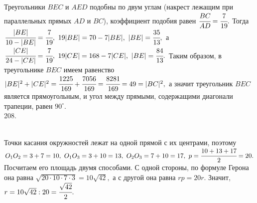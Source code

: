 \documentclass[12pt]{article}
\begin{document}
Треугольники $BEC$ и $AED$ подобны по двум углам (накрест лежащим при параллельных прямых $AD$ и $BC$), коэффициент подобия равен $\cfrac{BC}{AD}=
\cfrac{7}{19}.$ Тогда $\cfrac{|BE|}{10-|BE|}=\cfrac{7}{19},\ 19|BE|=70-7|BE|,\ |BE|=\cfrac{35}{13},$ а $\cfrac{|CE|}{24-|CE|}=\cfrac{7}{19},\ 19|CE|=168-7|CE|,\ |BE|=\cfrac{84}{13}.$ Таким образом, в треугольнике $BEC$ имеем равенство $|BE|^2+|CE|^2=\cfrac{1225}{169}+\cfrac{7056}{169}=\cfrac{8281}{169}=49=|BC|^2,$ а значит треугольник $BEC$ является прямоугольным, и угол между прямыми, содержащими диагонали трапеции, равен $90^\circ.$\\
208. \begin{figure}[ht!]
\end{figure}\\
Точки касания окружностей лежат на одной прямой с их центрами, поэтому $O_1O_2=3+7=10,\ O_1O_3=3+10=13,\ O_2O_3=7+10=17,\ p=\cfrac{10+13+17}{2}=20.$ Посчитаем его площадь двумя способами. С одной стороны, по формуле Герона она равна $\sqrt{20\cdot10\cdot7\cdot3}=10\sqrt{42},$ а с другой она равна $rp=20r.$ Значит, $r=10\sqrt{42}:20=\cfrac{\sqrt{42}}{2}.$\\
\end{document}
